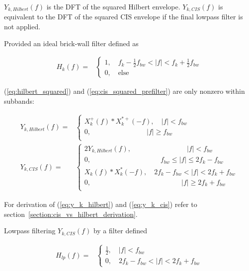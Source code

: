 \documentclass [11pt, proquest,oneside] {ganter_thesis}[2015/03/03]
\begin{document}
$Y_{k,Hilbert}(f)$ is the DFT of the squared Hilbert envelope.  $Y_{k,CIS}(f)$ is equivalent to the DFT of the squared CIS envelope if the final lowpass filter is not applied.

Provided an ideal brick-wall filter defined as

\begin{align}
\label{eq:ideal_brickwall_cis_vs_hilbert}
H_k(f) =& \left\{
                \begin{array}{ll}
                1, \quad f_k - \frac{1}{2} f_{bw} < |f| < f_k + \frac{1}{2} f_{bw} \\
                0, \quad \mathrm{else}
                \end{array}
              \right.
\end{align}

(\ref{eq:hilbert_squared}) and (\ref{eq:cis_squared_prefilter}) are only nonzero within subbands:

\begin{align}
\label{eq:y_k_hilbert}
Y_{k,Hilbert}(f) =& \left\{
			 \begin{array}{ll}
X^+_{k}(f) * X^{*+}_{k}(-f), \quad |f| < f_{bw} \\
0, \qquad \qquad \qquad \qquad |f| \geq f_{bw} \\
                \end{array}
               \right. \\
\label{eq:y_k_cis}
Y_{k,CIS}(f) =& \left\{
			 \begin{array}{ll}
2Y_{k,Hilbert}(f), \quad \qquad \qquad \qquad \quad |f| < f_{bw} \\
0, \qquad \qquad \qquad \qquad \qquad  f_{bw} \leq |f| \leq 2f_k - f_{bw}  \\
X_{k}(f) * X^*_{k}(-f), \quad 2f_k - f_{bw} < |f| < 2f_k + f_{bw} \\
0, \qquad \qquad \qquad \qquad \qquad \quad \qquad |f| \geq 2f_k + f_{bw}  \\
                \end{array}
               \right.
\end{align}

For derivation of (\ref{eq:y_k_hilbert}) and (\ref{eq:y_k_cis}) refer to section~\ref{section:cis_vs_hilbert_derivation}.

Lowpass filtering $Y_{k,CIS}(f)$ by a filter defined

\begin{align}
H_{lp}(f) =& \left\{
                \begin{array}{ll}
                \frac{1}{2}, \quad |f| < f_{bw} \\
                 0, \quad 2f_k - f_{bw} < |f| < 2f_k + f_{bw}
                \end{array}
              \right.
\end{align}
\end{document}

